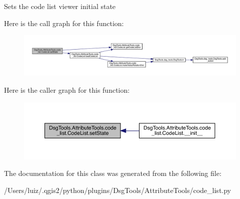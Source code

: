 \begin{DoxyVerb}Sets the code list viewer initial state
\end{DoxyVerb}
 Here is the call graph for this function\+:
\nopagebreak
\begin{figure}[H]
\begin{center}
\leavevmode
\includegraphics[width=350pt]{class_dsg_tools_1_1_attribute_tools_1_1code__list_1_1_code_list_af2f576bf21080f886795e46d6d093331_cgraph}
\end{center}
\end{figure}
Here is the caller graph for this function\+:
\nopagebreak
\begin{figure}[H]
\begin{center}
\leavevmode
\includegraphics[width=350pt]{class_dsg_tools_1_1_attribute_tools_1_1code__list_1_1_code_list_af2f576bf21080f886795e46d6d093331_icgraph}
\end{center}
\end{figure}


The documentation for this class was generated from the following file\+:\begin{DoxyCompactItemize}
\item 
/\+Users/luiz/.\+qgis2/python/plugins/\+Dsg\+Tools/\+Attribute\+Tools/code\+\_\+list.\+py\end{DoxyCompactItemize}
